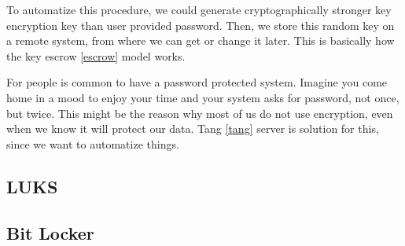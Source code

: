 \documentclass[../xdudla00-porting-Tang-to-Open-WRT.tex]{subfiles}
\begin{document}
To automatize this procedure, we could generate cryptographically stronger key encryption key than user provided password.
Then, we store this random key on a remote system, from where we can get or change it later.
This is basically how the key escrow \ref{escrow} model works.

For people is common to have a password protected system.
Imagine you come home in a mood to enjoy your time and your system asks for password, not once, but twice.
This might be the reason why most of us do not use encryption, even when we know it will protect our data.
Tang \ref{tang} server is solution for this, since we want to automatize things.

\subsection{LUKS}


\subsection{Bit Locker}
\end{document}
